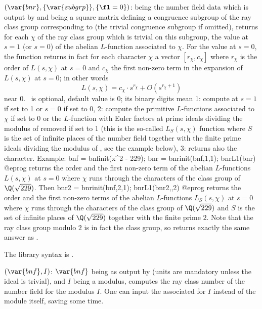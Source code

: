 $(\var{bnr}, \{\var{subgrp}\}, \{\fl=0\})$: \label{se:bnrL1} being
the number field data which is output by  and
 being a square matrix defining a congruence subgroup of the
ray class group corresponding to  (the trivial congruence subgroup
if omitted), returns for each  $\chi$ of the ray class group
which is trivial on this subgroup, the value at $s = 1$ (or $s = 0$) of the
abelian $L$-function associated to $\chi$. For the value at $s = 0$, the
function returns in fact for each character $\chi$ a vector $[r_\chi ,
c_\chi]$ where $r_\chi$ is the order of $L(s, \chi)$ at $s = 0$ and $c_\chi$
the first non-zero term in the expansion of $L(s, \chi)$ at $s = 0$; in other
words
%
$$L(s, \chi) = c_\chi \cdot s^{r_\chi} + O(s^{r_\chi + 1})$$
%
\noindent near $0$. \fl\ is optional, default value is 0; its binary digits
mean 1: compute at $s = 1$ if set to 1 or $s = 0$ if set to 0, 2: compute the
primitive $L$-functions associated to $\chi$ if set to 0 or the $L$-function
with Euler factors at prime ideals dividing the modulus of  removed
if set to 1 (this is the so-called $L_S(s, \chi)$ function where $S$ is the
set of infinite places of the number field together with the finite prime
ideals dividing the modulus of , see the example below), 3: returns
also the character. Example:
\bprog
bnf = bnfinit(x^2 - 229);
bnr = bnrinit(bnf,1,1);
bnrL1(bnr)
@eprog\noindent
returns the order and the first non-zero term of the abelian
$L$-functions $L(s, \chi)$ at $s = 0$ where $\chi$ runs through the
characters of the class group of $\Q(\sqrt{229})$. Then
\bprog
bnr2 = bnrinit(bnf,2,1);
bnrL1(bnr2,,2)
@eprog\noindent
returns the order and the first non-zero terms of the abelian
$L$-functions $L_S(s, \chi)$ at $s = 0$ where $\chi$ runs through the
characters of the class group of $\Q(\sqrt{229})$ and $S$ is the set
of infinite places of $\Q(\sqrt{229})$ together with the finite prime
$2$. Note that the ray class group modulo $2$ is in fact the class
group, so  returns exactly the same answer as
.

The library syntax is .

$(\var{bnf},I)$: \label{se:bnrclassno}$\var{bnf}$ being as output by
 (units are mandatory unless the ideal is trivial), and $I$
being a modulus, computes the ray class number of the number field for the
modulus $I$. One can input the associated  for $I$ instead of the
module itself, saving some time.

